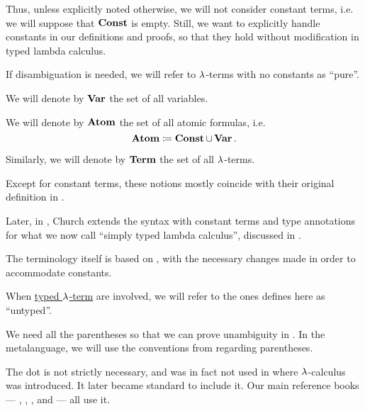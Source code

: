 \begin{definition}
\begin{thmenum}
    Thus, unless explicitly noted otherwise, we will not consider constant terms, i.e. we will suppose that \( \op*{Const} \) is empty. Still, we want to explicitly handle constants in our definitions and proofs, so that they hold without modification in typed lambda calculus.

    If disambiguation is needed, we will refer to \( \mathrm{\lambda} \)-terms with no constants as \enquote{pure}.

     We will denote by \( \op*{Var} \) the set of all variables.

     We will denote by \( \op*{Atom} \) the set of all atomic formulas, i.e.
    \begin{equation*}
      \op*{Atom} \coloneqq \op*{Const} \cup \op*{Var}.
    \end{equation*}

     Similarly, we will denote by \( \op*{Term} \) the set of all \( \mathrm{\lambda} \)-terms.
  \end{thmenum}
\end{definition}
\begin{comments}
  \item Except for constant terms, these notions mostly coincide with their original definition in \cite[352]{Church1932Untyped}.

  Later, in \cite[56]{Church1940STT}, Church extends the syntax with constant terms and type annotations for what we now call \enquote{simply typed lambda calculus}, discussed in .

  The terminology itself is based on \cite[def. 1A1]{Hindley1997STT}, with the necessary changes made in order to accommodate constants.

  \item When \hyperref[def:typed_lambda_term]{typed \( \mathrm{\lambda} \)-term} are involved, we will refer to the ones defines here as \enquote{untyped}.

  \item We need all the parentheses so that we can prove unambiguity in . In the metalanguage, we will use the conventions from  regarding parentheses.

  \item The dot is not strictly necessary, and was in fact not used in  where \( \mathrm{\lambda} \)-calculus was introduced. It later became standard to include it. Our main reference books --- , , ,  and  --- all use it.
\end{comments}

